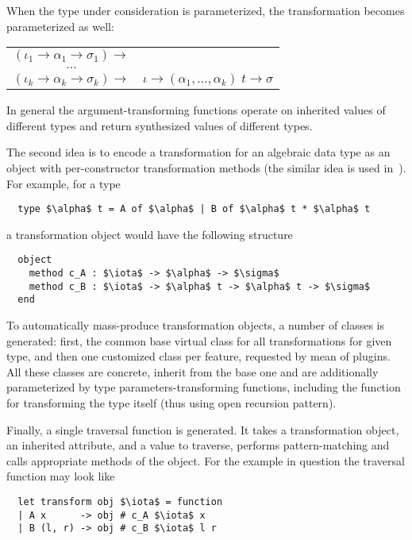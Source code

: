 \documentclass[twocolumn,8pt]{extarticle}
\begin{document}
When the type under consideration is parameterized, the transformation becomes parameterized as well:

\begin{tabular}{cl}
  $(\iota_1 \to \alpha_1 \to \sigma_1) \to$ & \\
  $\dots$                                  & \\
  $(\iota_k \to \alpha_k \to \sigma_k) \to$ & $\iota \to (\alpha_1,\dots,\alpha_k)\;t \to \sigma$
\end{tabular}

In general the argument-transforming functions operate on inherited values of different types and return synthesized values of different types.

The second idea is to encode a transformation for an algebraic data type as an object with per-constructor transformation methods (the similar idea is
used in~\cite{Visitors}). For example, for a type

\begin{lstlisting}
  type $\alpha$ t = A of $\alpha$ | B of $\alpha$ t * $\alpha$ t 
\end{lstlisting}

a transformation object would have the following structure

\begin{lstlisting}
  object
    method c_A : $\iota$ -> $\alpha$ -> $\sigma$
    method c_B : $\iota$ -> $\alpha$ t -> $\alpha$ t -> $\sigma$
  end
\end{lstlisting}

To automatically mass-produce transformation objects, a number of classes is generated: first, the common base virtual class for all transformations for
given type, and then one customized class per feature, requested by mean of plugins. All these classes are concrete, inherit from the
base one and are additionally parameterized by type parameters-transforming functions, including the function for transforming the type itself (thus
using open recursion pattern).

Finally, a single traversal function is generated. It takes a transformation object, an inherited attribute, and a value to traverse, performs pattern-matching
and calls appropriate methods of the object. For the example in question the traversal function may look like

\begin{lstlisting}
  let transform obj $\iota$ = function
  | A x      -> obj # c_A $\iota$ x
  | B (l, r) -> obj # c_B $\iota$ l r
\end{lstlisting}
\end{document}
